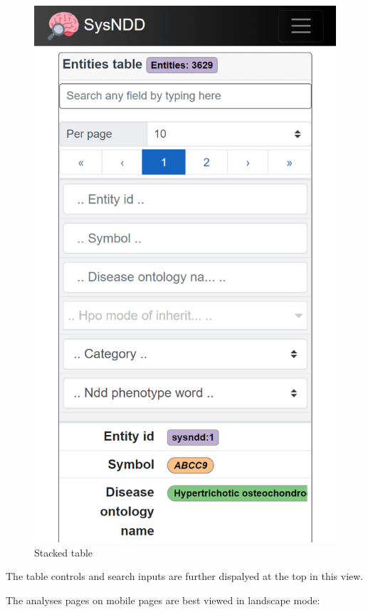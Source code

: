 \documentclass[
]{article}
\begin{document}
\begin{figure}
\centering
\includegraphics{./static/img/02_22-mobile-stacked-table.png}
\caption{Stacked table}
\end{figure}

The table controls and search inputs are further dispalyed at the top in this view.

The analyses pages on mobile pages are best viewed in landscape mode:
\end{document}
